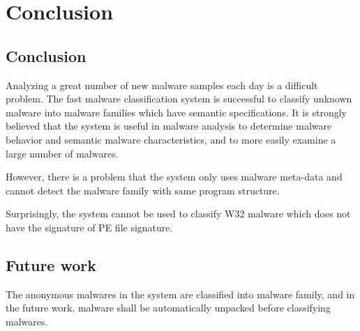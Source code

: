 
\chapter{Conclusion}\label{chap:7}
\section{Conclusion}
Analyzing a great number of new malware samples each day is a difficult problem. The fast malware classification system is successful to classify unknown malware into malware families which have semantic specifications. It is strongly believed that the system is useful in malware analysis to determine malware behavior and semantic malware characteristics, and to more easily examine a large number of malwares.

However, there is a problem that the system only uses malware meta-data and cannot detect the malware family with same program structure.

Surprisingly, the system cannot be used to classify W32 malware which does not have the signature of PE file signature. 
 
\section{Future work}
The anonymous malwares in the system are classified into malware family, and in the future work, malware shall be automatically unpacked before classifying malwares. 